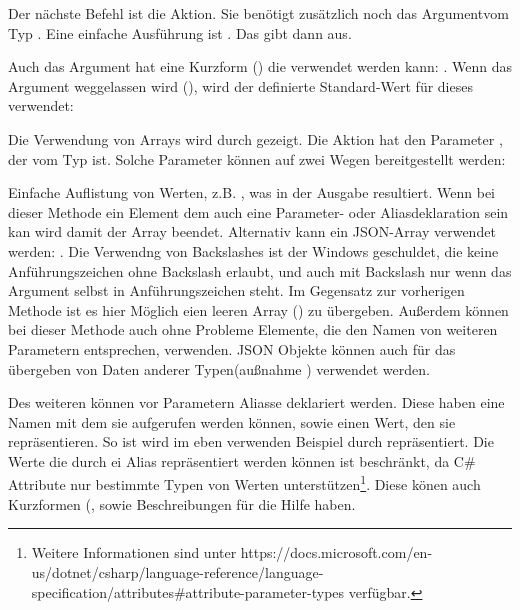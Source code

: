 Der nächste Befehl ist die  Aktion.
Sie benötigt zusätzlich noch das  Argumentvom Typ .
Eine einfache Ausführung ist .
Das gibt dann  aus.

Auch das Argument hat eine Kurzform () die verwendet werden kann: .
Wenn das Argument weggelassen wird (), wird der definierte Standard-Wert für dieses verwendet:

Die Verwendung von Arrays wird durch  gezeigt.
Die Aktion hat den Parameter , der vom Typ  ist.
Solche Parameter können auf zwei Wegen bereitgestellt werden:
\begin{outline}
 \1 Einfache Auflistung von Werten, z.B. , was in der Ausgabe  resultiert.
 Wenn bei dieser Methode ein Element dem auch eine Parameter- oder Aliasdeklaration sein kan wird damit der Array beendet.
 \1 Alternativ kann ein JSON-Array verwendet werden: .
 Die Verwendng von Backslashes ist der Windows  geschuldet, die keine Anführungszeichen ohne Backslash erlaubt,
 und auch mit Backslash nur wenn das Argument selbst in Anführungszeichen steht.
 Im Gegensatz zur vorherigen Methode ist es hier Möglich eien leeren Array (\inlinecode{[]}) zu übergeben.
 Au\ss erdem können bei dieser Methode auch ohne Probleme Elemente, die den Namen von weiteren Parametern entsprechen, verwenden.
 JSON Objekte können auch für das übergeben von Daten anderer Typen(au\ss nahme ) verwendet werden.
\end{outline} 

Des weiteren können vor Parametern Aliasse deklariert werden.
Diese haben eine Namen mit dem sie aufgerufen werden können, sowie einen Wert, den sie repräsentieren.
So ist wird im eben verwenden Beispiel  durch  repräsentiert.
Die Werte die durch ei Alias repräsentiert werden können ist beschränkt, da C\# Attribute nur bestimmte Typen von Werten unterstützen\footnote{Weitere Informationen sind unter https://docs.microsoft.com/en-us/dotnet/csharp/language-reference/language-specification/attributes\#attribute-parameter-types verfügbar.}.
Diese könen auch Kurzformen (, sowie Beschreibungen für die Hilfe haben.

